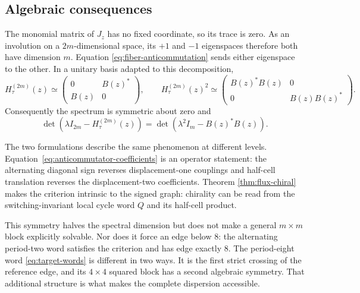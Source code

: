 \subsection{Algebraic consequences}

The monomial matrix of $J_z$ has no fixed coordinate, so its trace is zero.
As an involution on a $2m$-dimensional space, its $+1$ and $-1$ eigenspaces
therefore both have dimension $m$.  Equation
\eqref{eq:fiber-anticommutation} sends either eigenspace to the other.  In a
unitary basis adapted to this decomposition,
\begin{equation}
 H_\tau^{(2m)}(z)\simeq
 \begin{pmatrix}0&B(z)^*\\ B(z)&0\end{pmatrix},
 \qquad
 H_\tau^{(2m)}(z)^2\simeq
 \begin{pmatrix}B(z)^*B(z)&0\\0&B(z)B(z)^*\end{pmatrix}.
 \label{eq:general-chiral-block}
\end{equation}
Consequently the spectrum is symmetric about zero and
\begin{equation}
 \det(\lambda I_{2m}-H_\tau^{(2m)}(z))
 =\det(\lambda^2I_m-B(z)^*B(z)).
 \label{eq:general-even-characteristic}
\end{equation}

The two formulations describe the same phenomenon at different levels.
Equation~\eqref{eq:anticommutator-coefficients} is an operator statement: the
alternating diagonal sign reverses displacement-one couplings and half-cell
translation reverses the displacement-two coefficients.  Theorem
\ref{thm:flux-chiral} makes the criterion intrinsic to the signed graph:
chirality can be read from the switching-invariant local cycle word $Q$ and
its half-cell product.

This symmetry halves the spectral dimension but does not make a general
$m\times m$ block explicitly solvable.  Nor does it force an edge below $8$:
the alternating period-two word satisfies the criterion and has edge exactly
$8$.  The period-eight word \eqref{eq:target-words} is different in two ways.
It is the first strict crossing of the reference edge, and its $4\times4$
squared block has a second algebraic symmetry.  That additional structure is
what makes the complete dispersion accessible.
